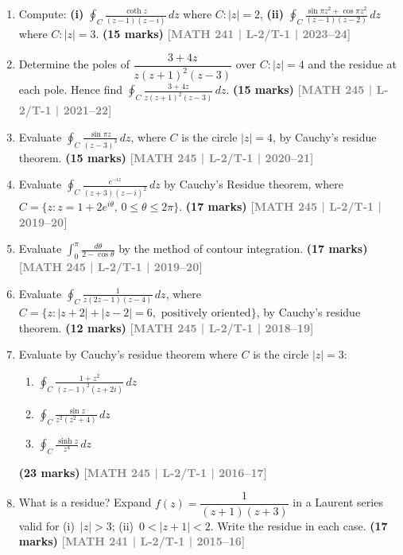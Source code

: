 \documentclass[12pt,a3paper]{article}
\newcommand{\yr}[1]{\hfill\textcolor{gray}{\small\textbf{[#1]}}}
\newcommand{\mk}[1]{\textcolor{orange!70!black}{\small\textbf{(#1 marks)}}}
\begin{document}
\begin{enumerate}

  
\item Compute: \textbf{(i)} $\displaystyle\oint_{C}\frac{\coth z}{(z-1)(z-i)}\,dz$ where $C:|z|=2$, \quad \textbf{(ii)} $\displaystyle\oint_{C}\frac{\sin\pi z^{2}+\cos\pi z^{2}}{(z-1)(z-2)}\,dz$ where $C:|z|=3$.
\mk{15} \yr{MATH 241 | L-2/T-1 | 2023--24}


\item Determine the poles of $\dfrac{3+4z}{z(z+1)^{2}(z-3)}$ over $C:|z|=4$ and the residue at each pole. Hence find $\displaystyle\oint_{C}\frac{3+4z}{z(z+1)^{2}(z-3)}\,dz$.
\mk{15} \yr{MATH 245 | L-2/T-1 | 2021--22}


\item Evaluate $\displaystyle\oint_{C} \frac{\sin\pi z}{(z-3)^{3}}\,dz$, where $C$ is the circle $|z|=4$, by Cauchy's residue theorem.
\mk{15} \yr{MATH 245 | L-2/T-1 | 2020--21}


\item Evaluate $\displaystyle\oint_{C}\frac{e^{-iz}}{(z+3)(z-i)^{2}}\,dz$ by Cauchy's Residue theorem, where $C=\{z:z=1+2e^{i\theta},\,0\le\theta\le 2\pi\}$.
\mk{17} \yr{MATH 245 | L-2/T-1 | 2019--20}


\item Evaluate $\displaystyle\int_{0}^{\pi}\frac{d\theta}{2-\cos\theta}$ by the method of contour integration.
\mk{17} \yr{MATH 245 | L-2/T-1 | 2019--20}


\item Evaluate $\displaystyle\oint_{C}\frac{1}{z(2z-1)(z-4)}\,dz$, where $C=\{z:|z+2|+|z-2|=6,\text{ positively oriented}\}$, by Cauchy's residue theorem.
\mk{12} \yr{MATH 245 | L-2/T-1 | 2018--19}


\item Evaluate by Cauchy's residue theorem where $C$ is the circle $|z|=3$:
\begin{enumerate}
  \item $\displaystyle\oint_{C}\frac{1+z^{2}}{(z-1)^{2}(z+2i)}\,dz$
  \item $\displaystyle\oint_{C}\frac{\sin z}{z^{2}(z^{2}+4)}\,dz$
  \item $\displaystyle\oint_{C}\frac{\sinh z}{z^{4}}\,dz$
\end{enumerate}
\mk{23} \yr{MATH 245 | L-2/T-1 | 2016--17}


\item What is a residue? Expand $f(z)=\dfrac{1}{(z+1)(z+3)}$ in a Laurent series valid for (i)~$|z|>3$; (ii)~$0<|z+1|<2$. Write the residue in each case.
\mk{17} \yr{MATH 241 | L-2/T-1 | 2015--16}



\end{enumerate}
\end{document}
